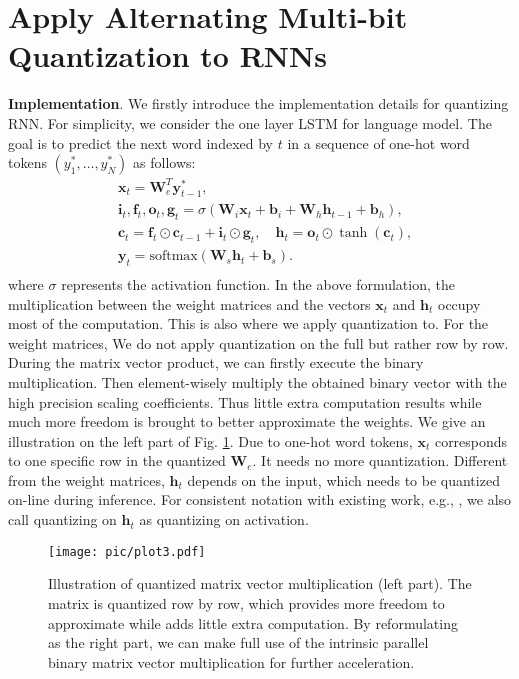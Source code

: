 \documentclass{article} %
\newcommand{\y}{\mathbf{y}}
\newcommand{\x}{\mathbf{x}}
\newcommand{\db}{\mathbf{b}}
\newcommand{\W}{\mathbf{W}}
\newcommand{\<}{\left\langle}
\renewcommand{\>}{\right\rangle}
\begin{document}
\section{Apply Alternating Multi-bit Quantization to RNNs}
\textbf{Implementation}.  We firstly introduce the implementation details for quantizing RNN. For simplicity, we consider the one layer
 LSTM for language model. The goal is to predict the next  word indexed by $t$ in a sequence of one-hot word tokens $(y_1^*,\ldots,y_N^* )$ as follows:
\begin{equation}\label{lstm_equation}
\begin{split}
& \x_t =   \W_e^T \y_{t-1}^*,  \qquad    \\
&\mathbf{i}_t, \mathbf{f}_t, \mathbf{o}_t, \mathbf{g}_t = \sigma(\W_i \x_t + \db_i + \W_h \mathbf{h}_{t-1} + \db_h), \\
&\mathbf{c}_t = \mathbf{f}_t \odot \mathbf{c}_{t-1} + \mathbf{i}_t \odot \mathbf{g}_t,  \quad  \mathbf{h}_t =  \mathbf{o}_t \odot \tanh(\mathbf{c}_t), \\
&\y_t = \text{softmax}(\W_s \mathbf{h}_t + \db_s ). \\
\end{split}
\end{equation} 
where $\sigma$ represents the activation function. In the above formulation, the multiplication between the weight matrices and the vectors $\x_t$ and $\mathbf{h}_t$ occupy most of the computation. This is also where we apply quantization to. For the weight matrices, We do not apply quantization on the full but rather row by row.
During the matrix vector product, we can firstly execute the binary multiplication. Then element-wisely multiply the obtained binary vector with the high precision scaling coefficients. Thus little extra computation results while much more freedom is brought to better approximate the weights. We give an illustration on the left part of Fig. \ref{product}. Due to one-hot word tokens, $\x_t$ corresponds to one specific row in the quantized $\W_e$.  It needs no more quantization. Different from the weight matrices, $\mathbf{h}_t$ depends on the input, which needs to be quantized on-line during inference.  For consistent notation with existing work, e.g., \citep{qnn, balanced}, we also call quantizing on $\mathbf{h}_t$ as quantizing on activation.  


\begin{figure}[t!]
	\centering
	\texttt{[image: pic/plot3.pdf]} \caption{Illustration of quantized matrix vector multiplication (left part). The matrix is quantized row by row, which provides more freedom to approximate while adds little extra computation. By reformulating as the right part, we can make full use of the intrinsic parallel binary matrix vector multiplication for further acceleration.}
	\label{product}   
\end{figure}
\end{document}
